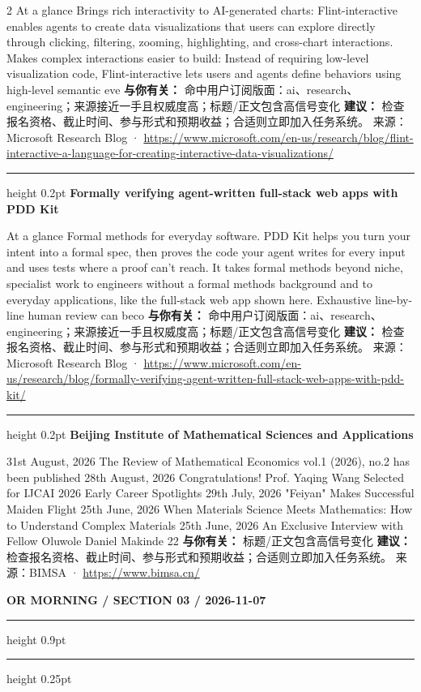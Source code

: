 \documentclass[10.5pt]{ctexart}
\begin{document}
\begin{multicols}{2}
At a glance Brings rich interactivity to AI-generated charts: Flint-interactive enables agents to create data visualizations that users can explore directly through clicking, filtering, zooming, highlighting, and cross-chart interactions. Makes complex interactions easier to build: Instead of requiring low-level visualization code, Flint-interactive lets users and agents define behaviors using high-level semantic eve
\textbf{与你有关：} 命中用户订阅版面：ai、research、engineering；来源接近一手且权威度高；标题/正文包含高信号变化
\textbf{建议：} 检查报名资格、截止时间、参与形式和预期收益；合适则立即加入任务系统。
{\footnotesize\color{ormuted} 来源：Microsoft Research Blog · \url{https://www.microsoft.com/en-us/research/blog/flint-interactive-a-language-for-creating-interactive-data-visualizations/}}
\vspace{2mm}
\hrule height 0.2pt
\vspace{2mm}
{\large\bfseries Formally verifying agent-written full-stack web apps with PDD Kit}\par
At a glance Formal methods for everyday software. PDD Kit helps you turn your intent into a formal spec, then proves the code your agent writes for every input and uses tests where a proof can’t reach. It takes formal methods beyond niche, specialist work to engineers without a formal methods background and to everyday applications, like the full-stack web app shown here. Exhaustive line-by-line human review can beco
\textbf{与你有关：} 命中用户订阅版面：ai、research、engineering；来源接近一手且权威度高；标题/正文包含高信号变化
\textbf{建议：} 检查报名资格、截止时间、参与形式和预期收益；合适则立即加入任务系统。
{\footnotesize\color{ormuted} 来源：Microsoft Research Blog · \url{https://www.microsoft.com/en-us/research/blog/formally-verifying-agent-written-full-stack-web-apps-with-pdd-kit/}}
\vspace{2mm}
\hrule height 0.2pt
\vspace{2mm}
{\large\bfseries Beijing Institute of Mathematical Sciences and Applications}\par
31st August, 2026 The Review of Mathematical Economics vol.1 (2026), no.2 has been published 28th August, 2026 Congratulations! Prof. Yaqing Wang Selected for IJCAI 2026 Early Career Spotlights 29th July, 2026 "Feiyan" Makes Successful Maiden Flight 25th June, 2026 When Materials Science Meets Mathematics: How to Understand Complex Materials 25th June, 2026 An Exclusive Interview with Fellow Oluwole Daniel Makinde 22
\textbf{与你有关：} 标题/正文包含高信号变化
\textbf{建议：} 检查报名资格、截止时间、参与形式和预期收益；合适则立即加入任务系统。
{\footnotesize\color{ormuted} 来源：BIMSA · \url{https://www.bimsa.cn/}}
\end{multicols}
\newpage
{\small\bfseries OR MORNING / SECTION 03 / 2026-11-07}
\vspace{2mm}
\hrule height 0.9pt
\vspace{1.5mm}
\hrule height 0.25pt
\vspace{4mm}
\end{document}
